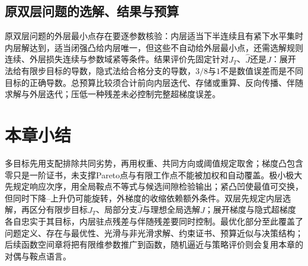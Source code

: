 \subsection{原双层问题的选解、结果与预算}

原双层问题的外层最小点存在要逐参数核验：内层适当下半连续且有紧下水平集时内层解达到，适当闭强凸给内层唯一，但这些不自动给外层最小点，还需选解规则连续、外层损失连续与参数域紧等条件。结果评价先固定针对$J_T$、$\widehat J$还是$J$：展开法给有限步目标的导数，隐式法给合格分支的导数，$3/8$与$1$不是数值误差而是不同目标的正确导数。总预算比较须合计前向内层迭代、存储或重算、反向传播、伴随求解与外层迭代；压低一种残差未必控制完整超梯度误差。

\section{本章小结}

多目标先用支配排除共同劣势，再用权重、共同方向或阈值规定取舍；梯度凸包含零只是一阶证书，未支撑Pareto点与有限工作点不能被加权和自动覆盖。极小极大先规定响应次序，用全局鞍点不等式与候选间隙检验输出；紧凸凹使最值可交换，但同时下降--上升仍可能旋转，外梯度的收缩依赖额外条件。双层先规定内层选解，再区分有限步目标$J_T$、局部分支$\widehat J$与理想全局选解$J$；展开梯度与隐式超梯度各自忠实于其目标，内层驻点残差与伴随残差要同时控制。最优化部分至此覆盖了问题定义、存在与最优性、光滑与非光滑求解、约束证书、预算近似与决策结构；后续函数空间章将把有限维参数推广到函数，随机逼近与策略评价则会复用本章的对偶与鞍点语言。
